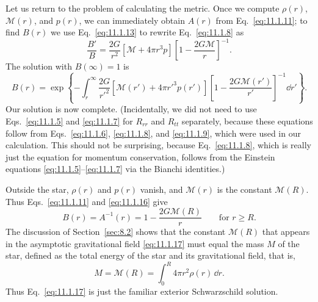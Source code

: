 Let us return to the problem of calculating the metric. Once we compute
\(\rho(r)\), \(\mathcal{M}(r)\), and \(p(r)\), we can immediately obtain
\(A(r)\) from Eq.~\eqref{eq:11.1.11}; to find \(B(r)\) we use
Eq.~\eqref{eq:11.1.13} to rewrite Eq.~\eqref{eq:11.1.8} as
\[
  \frac{B'}B
  =
  \frac{2G}{r^2}\left[\mathcal{M}+4\pi r^3p\right]
  \left[1-\frac{2G\mathcal{M}}r\right]^{-1}.
\]
The solution with \(B(\infty)=1\) is
\begin{equation}
  B(r)
  =
  \exp\left\{
    -\int_r^\infty
    \frac{2G}{r'^2}
    \left[\mathcal{M}(r')+4\pi r'^3p(r')\right]
    \left[1-\frac{2G\mathcal{M}(r')}{r'}\right]^{-1}
    \dd r'
  \right\}.
  \tag{11.1.16}\label{eq:11.1.16}
\end{equation}
Our solution is now complete. (Incidentally, we did not need to use
Eqs.~\eqref{eq:11.1.5} and \eqref{eq:11.1.7} for \(R_{rr}\) and \(R_{tt}\)
separately, because these equations follow from Eqs.~\eqref{eq:11.1.6},
\eqref{eq:11.1.8}, and \eqref{eq:11.1.9}, which were used in our
calculation. This should not be surprising, because Eq.~\eqref{eq:11.1.8},
which is really just the equation for momentum conservation, follows from the
Einstein equations \eqref{eq:11.1.5}--\eqref{eq:11.1.7} via the Bianchi
identities.)

Outside the star, \(\rho(r)\) and \(p(r)\) vanish, and \(\mathcal{M}(r)\) is
the constant \(\mathcal{M}(R)\). Thus Eqs.~\eqref{eq:11.1.11} and
\eqref{eq:11.1.16} give
\begin{equation}
  B(r)=A^{-1}(r)=1-\frac{2G\mathcal{M}(R)}r
  \qquad\text{for }r\ge R.
  \tag{11.1.17}\label{eq:11.1.17}
\end{equation}
The discussion of Section~\ref{sec:8.2} shows that the constant
\(\mathcal{M}(R)\) that appears in the asymptotic gravitational field
\eqref{eq:11.1.17} must equal the mass \(M\) of the star, defined as the total
energy of the star and its gravitational field, that is,
\begin{equation}
  M=\mathcal{M}(R)=\int_0^R4\pi r^2\rho(r)\,\dd r.
  \tag{11.1.18}\label{eq:11.1.18}
\end{equation}
Thus Eq.~\eqref{eq:11.1.17} is just the familiar exterior Schwarzschild
solution.

